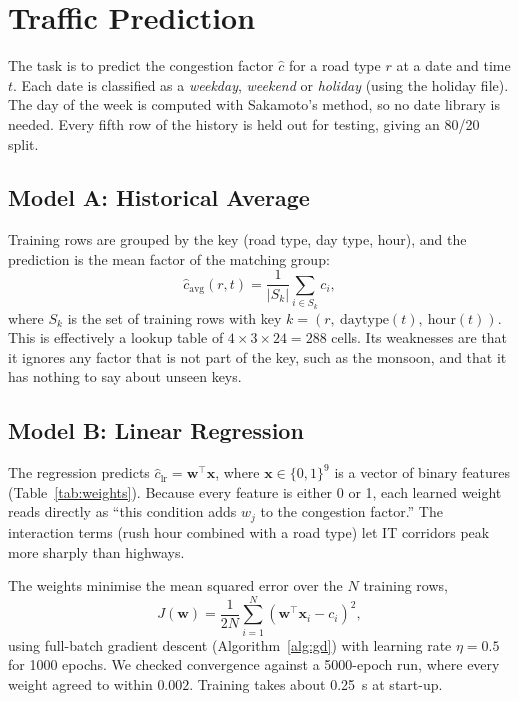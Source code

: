 \documentclass[conference]{IEEEtran}
\begin{document}
\section{Traffic Prediction}\label{sec:traffic}

The task is to predict the congestion factor $\hat{c}$ for a road type
$r$ at a date and time $t$. Each date is classified as a
\emph{weekday}, \emph{weekend} or \emph{holiday} (using the holiday file).
The day of the week is computed with Sakamoto's method, so no date
library is needed. Every fifth row of the history is held out for
testing, giving an 80/20 split.

\subsection{Model A: Historical Average}
Training rows are grouped by the key (road type, day type, hour), and
the prediction is the mean factor of the matching group:
\begin{equation}
  \hat{c}_{\text{avg}}(r,t) = \frac{1}{|S_k|}\sum_{i\in S_k} c_i ,
\end{equation}
where $S_k$ is the set of training rows with key
$k=(r,\ \text{daytype}(t),\ \text{hour}(t))$.
This is effectively a lookup table of $4\times3\times24=288$ cells. Its
weaknesses are that it ignores any factor that is not part of the key,
such as the monsoon, and that it has nothing to say about unseen keys.

\subsection{Model B: Linear Regression}
The regression predicts $\hat{c}_{\text{lr}} = \mathbf{w}^\top\mathbf{x}$,
where $\mathbf{x}\in\{0,1\}^9$ is a vector of binary features
(Table~\ref{tab:weights}). Because every feature is either 0 or 1, each
learned weight reads directly as ``this condition adds $w_j$ to the
congestion factor.'' The interaction terms (rush hour combined with a
road type) let IT corridors peak more sharply than highways.

The weights minimise the mean squared error over the $N$ training rows,
\begin{equation}
  J(\mathbf{w}) = \frac{1}{2N}\sum_{i=1}^{N}\left(\mathbf{w}^\top\mathbf{x}_i - c_i\right)^2,
\end{equation}
using full-batch gradient descent (Algorithm~\ref{alg:gd}) with learning
rate $\eta=0.5$ for 1000 epochs. We checked convergence against a 5000-epoch run, where
every weight agreed to within $0.002$. Training takes about
0.25~s at start-up.
\end{document}
